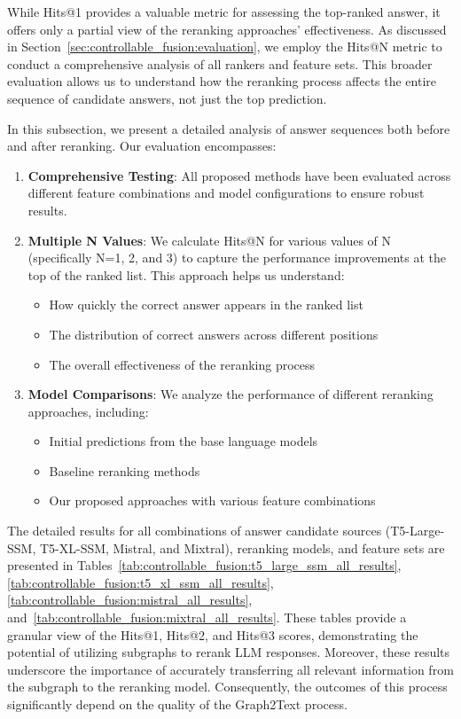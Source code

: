 While Hits@1 provides a valuable metric for assessing the top-ranked answer, it offers only a partial view of the reranking approaches' effectiveness. As discussed in Section~\ref{sec:controllable_fusion:evaluation}, we employ the Hits@N metric to conduct a comprehensive analysis of all rankers and feature sets. This broader evaluation allows us to understand how the reranking process affects the entire sequence of candidate answers, not just the top prediction.

In this subsection, we present a detailed analysis of answer sequences both before and after reranking. Our evaluation encompasses:

\begin{enumerate}
    \item \textbf{Comprehensive Testing}: All proposed methods have been evaluated across different feature combinations and model configurations to ensure robust results.
    
    \item \textbf{Multiple N Values}: We calculate Hits@N for various values of N (specifically N=1, 2, and 3) to capture the performance improvements at the top of the ranked list. This approach helps us understand:
    \begin{itemize}
        \item How quickly the correct answer appears in the ranked list
        \item The distribution of correct answers across different positions
        \item The overall effectiveness of the reranking process
    \end{itemize}
    
    \item \textbf{Model Comparisons}: We analyze the performance of different reranking approaches, including:
    \begin{itemize}
        \item Initial predictions from the base language models
        \item Baseline reranking methods
        \item Our proposed approaches with various feature combinations
    \end{itemize}
\end{enumerate}

The detailed results for all combinations of answer candidate sources (T5-Large-SSM, T5-XL-SSM, Mistral, and Mixtral), reranking models, and feature sets are presented in Tables~\ref{tab:controllable_fusion:t5_large_ssm_all_results}, \ref{tab:controllable_fusion:t5_xl_ssm_all_results}, \ref{tab:controllable_fusion:mistral_all_results}, and~\ref{tab:controllable_fusion:mixtral_all_results}. These tables provide a granular view of the Hits@1, Hits@2, and Hits@3 scores, demonstrating the potential of utilizing subgraphs to rerank LLM responses. Moreover, these results underscore the importance of accurately transferring all relevant information from the subgraph to the reranking model. Consequently, the outcomes of this process significantly depend on the quality of the Graph2Text process.


